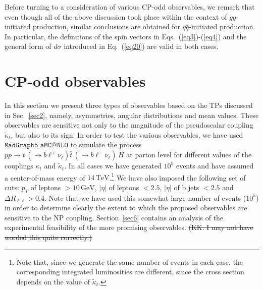 \documentclass[aps,preprint,tightenlines,floatfix,superscriptaddress,nofootinbib,showpacs]{revtex4-1}
\def\tbar{\bar{t}}
\def\bbar{\bar{b}}
\def\qbar{\bar{q}}
\def\nubar{{\bar{\nu}}_{\ell}}
\def\ppprocess{pp\to t\,\left(\rightarrow b {\ell}^+ \nu_{\ell}\right) \tbar\,\left(\rightarrow\bbar {\ell}^-\nubar\right)\,H}
\def\kp{\kappa_t}
\def\kpt{\tilde{\kappa}_t}
\providecommand{\DIFdel}[1]{{\protect\color{red}\sout{#1}}}                      %
\providecommand{\DIFdelbegin}{} %
\providecommand{\DIFdelend}{} %
\begin{document}
Before turning to a consideration of various CP-odd observables,
we remark that even though all of the above discussion took place
within the context of $gg$-initiated production, similar conclusions
are obtained for $q\qbar$-initiated production. In particular, the
definitions of the spin vectors in Eqs.~(\ref{eq3})-(\ref{eq4}) and
the general form of $d\sigma$ introduced in Eq.~(\ref{eq20}) are valid
in both cases.
\bigskip
\section{$\mathrm{\mathbf{CP}}$-odd observables}
\label{sec3}
In this section we present three types of observables based on the TPs discussed
in Sec.~\ref{sec2}, namely, asymmetries, angular
distributions and mean values. These observables are sensitive not only to the
magnitude of the pseudoscalar coupling $\kpt$, but also to its
sign.  In order to test the various observables, we have
used $\mathtt{MadGraph5\_aMC@NLO}$ \cite{Madgraph} to simulate the process
$\ppprocess$ at parton level for different values of the couplings
$\kp$ and $\kpt$.  In all cases we have generated $10^5$ events
and have assumed a center-of-mass energy of
$14\,\mathrm{TeV}$.\footnote{Note that, since we generate
  the same number of events in
  each case, the corresponding integrated luminosities are different, since the
  cross section depends on the value of $\kpt$.}
We have also imposed the
following set of cuts: $p_T$ of leptons $> 10\,\mathrm{GeV}$, $|\eta|$
of leptons $< 2.5$, $|\eta|$ of b jets $< 2.5$ and $\Delta
R_{\ell\ell}>0.4$.  Note that we have used this
somewhat large number of events ($10^5$) in order to determine clearly
the extent to which the proposed observables are sensitive to the NP
coupling.  Section~\ref{sec6} contains an
analysis of the experimental feasibility of the more promising observables.
\DIFdelbegin %
\DIFdel{(KK: I may not have worded this quite correctly.)}%
\DIFdelend 
\end{document}
